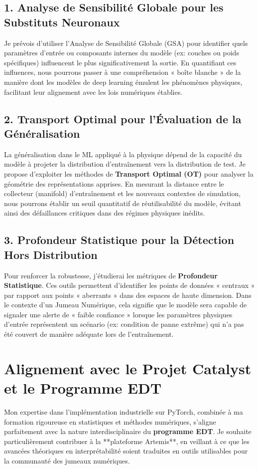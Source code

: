 \documentclass[11pt,a4paper]{article}
\begin{document}
\subsection{1. Analyse de Sensibilité Globale pour les Substituts Neuronaux}
Je prévois d'utiliser l'Analyse de Sensibilité Globale (GSA) pour identifier quels paramètres d'entrée ou composants internes du modèle (ex: couches ou poids spécifiques) influencent le plus significativement la sortie. En quantifiant ces influences, nous pourrons passer à une compréhension « boîte blanche » de la manière dont les modèles de deep learning émulent les phénomènes physiques, facilitant leur alignement avec les lois numériques établies.

\subsection{2. Transport Optimal pour l'Évaluation de la Généralisation}
La généralisation dans le ML appliqué à la physique dépend de la capacité du modèle à projeter la distribution d'entraînement vers la distribution de test. Je propose d'exploiter les méthodes de \textbf{Transport Optimal (OT)} pour analyser la géométrie des représentations apprises. En mesurant la distance entre le collecteur (manifold) d'entraînement et les nouveaux contextes de simulation, nous pourrons établir un seuil quantitatif de réutilisabilité du modèle, évitant ainsi des défaillances critiques dans des régimes physiques inédits.

\subsection{3. Profondeur Statistique pour la Détection Hors Distribution}
Pour renforcer la robustesse, j'étudierai les métriques de \textbf{Profondeur Statistique}. Ces outils permettent d'identifier les points de données « centraux » par rapport aux points « aberrants » dans des espaces de haute dimension. Dans le contexte d'un Jumeau Numérique, cela signifie que le modèle sera capable de signaler une alerte de « faible confiance » lorsque les paramètres physiques d'entrée représentent un scénario (ex: condition de panne extrême) qui n'a pas été couvert de manière adéquate lors de l'entraînement.

\section{Alignement avec le Projet Catalyst et le Programme EDT}
Mon expertise dans l'implémentation industrielle sur PyTorch, combinée à ma formation rigoureuse en statistiques et méthodes numériques, s'aligne parfaitement avec la nature interdisciplinaire du \textbf{programme EDT}. Je souhaite particulièrement contribuer à la **plateforme Artemis**, en veillant à ce que les avancées théoriques en interprétabilité soient traduites en outils utilisables pour la communauté des jumeaux numériques.
\end{document}

